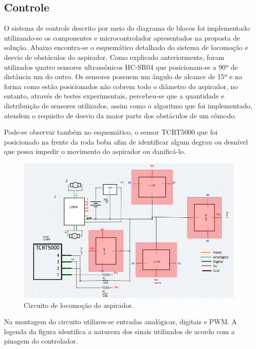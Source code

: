 
	\subsection{Controle} %
	\label{sub:controle2}
		O sistema de controle descrito por meio do diagrama de blocos foi implementado utilizando-se os componentes e microcontrolador apresentados na proposta de solução. Abaixo encontra-se o esquemático detalhado do sistema de locomoção e desvio de obstáculos do aspirador. Como explicado anteriormente, foram utilizados quatro sensores ultrassônicos HC-SR04 que posicionam-se a 90º de distância um do outro. Os sensores possuem um ângulo de alcance de 15º e na forma como estão posicionados não cobrem todo o diâmetro do aspirador, no entanto, através de testes experimentais, percebeu-se que a quantidade e distribuição de sensores utilizados, assim como o algoritmo que foi implementado, atendem o requisito de desvio da maior parte dos obstáculos de um cômodo.

		Pode-se observar também no esquemático, o sensor TCRT5000 que foi posicionado na frente da roda boba afim de identificar algum degrau ou desnível que possa impedir o movimento do aspirador ou danificá-lo.

		\begin{figure}[H]
			\centering
			\includegraphics[scale=0.7]{figuras/locomocao1.png}
			\caption{Circuito de locomoção do aspirador.}
			\label{img:circuito_de_locmoção}
		\end{figure}

		Na montagem do circuito utilizou-se entradas analógicas, digitais e PWM. A legenda da figura identifica a natureza dos sinais utilizados de acordo com a pinagem do controlador.

